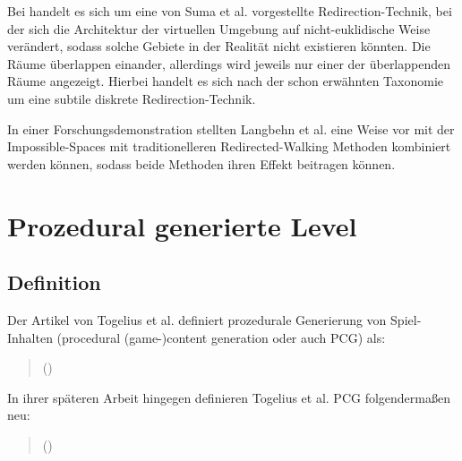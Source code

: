 Bei  handelt es sich um eine von
Suma et al. \cite{impossible-spaces-suma} vorgestellte Redirection-Technik, bei der sich die Architektur der virtuellen Umgebung auf nicht-euklidische Weise verändert, sodass solche Gebiete in der Realität nicht existieren könnten.
Die Räume überlappen einander, allerdings wird jeweils nur einer der überlappenden Räume angezeigt. Hierbei handelt es sich nach der schon erwähnten Taxonomie um eine subtile diskrete Redirection-Technik.

In einer Forschungsdemonstration \cite{redirected-spaces} stellten Langbehn et al. eine Weise vor mit der Impossible-Spaces mit traditionelleren Redirected-Walking Methoden %
kombiniert werden können, sodass beide Methoden ihren Effekt beitragen können.

\section{Prozedural generierte Level}

\subsection{Definition}

Der Artikel \cite{sbpcg} von Togelius et al. definiert prozedurale Generierung von Spiel-Inhalten (procedural (game-)content generation oder auch PCG) als:

\begin{quotation}
\end{quotation}

\begin{quotation}
    ()
\end{quotation}

In ihrer späteren Arbeit hingegen \cite{what-is-pcg} definieren Togelius et al. PCG folgendermaßen neu:
\begin{quotation}
\end{quotation}

\begin{quotation}
    ()
\end{quotation}

